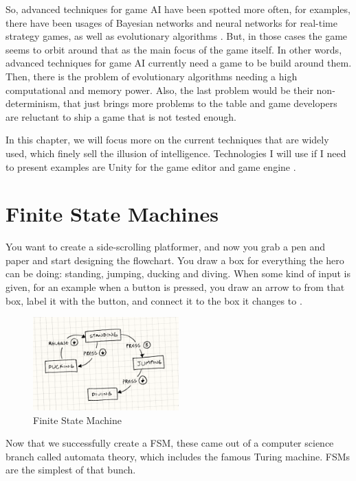 \documentclass[a4paper, 12pt]{book}
\begin{document}
So, advanced techniques for game AI have been spotted more often, for examples, there have been usages of Bayesian networks and neural networks for real-time strategy games, as well as evolutionary algorithms \cite{FuzzyAIGames}. But, in those cases the game seems to orbit around that as the main focus of the game itself. In other words, advanced techniques for game AI currently need a game to be build around them. Then, there is the problem of evolutionary algorithms needing a high computational and memory power. Also, the last problem would be their non-determinism, that just brings more problems to the table and game developers are reluctant to ship a game that is not tested enough.

In this chapter, we will focus more on the current techniques that are widely used, which finely sell the illusion of intelligence. Technologies I will use if I need to present examples are Unity for the game editor and game engine \cite{UnitySoftware}.

\section{Finite State Machines}

You want to create a side-scrolling platformer, and now you grab a pen and paper and start designing the flowchart. You draw a box for everything the hero can be doing: standing, jumping, ducking and diving. When some kind of input is given, for an example when a button is pressed, you draw an arrow to from that box, label it with the button, and connect it to the box it changes to \cite{GameProgrammingPattersFMS}.

\begin{figure}[h]
\begin{center}
\includegraphics[width=0.5\textwidth]{Images/state_FSM.png}
\end{center}
\caption{Finite State Machine}
\label{pic1}
\end{figure}

Now that we successfully create a FSM, these came out of a computer science branch called automata theory, which includes the famous Turing machine. FSMs are the simplest of that bunch.
\end{document}
